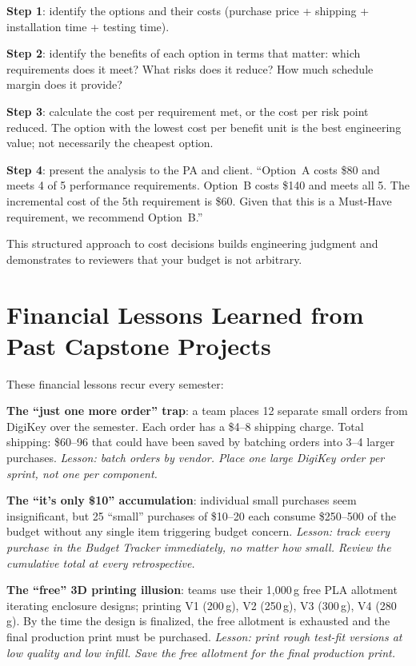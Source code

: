 \textbf{Step 1}: identify the options and their costs (purchase price + shipping + installation time + testing time).

\textbf{Step 2}: identify the benefits of each option in terms that matter: which requirements does it meet? What risks does it reduce? How much schedule margin does it provide?

\textbf{Step 3}: calculate the cost per requirement met, or the cost per risk point reduced. The option with the lowest cost per benefit unit is the best engineering value; not necessarily the cheapest option.

\textbf{Step 4}: present the analysis to the PA and client. ``Option~A costs \$80 and meets 4 of 5 performance requirements. Option~B costs \$140 and meets all 5. The incremental cost of the 5th requirement is \$60. Given that this is a Must-Have requirement, we recommend Option~B.''

This structured approach to cost decisions builds engineering judgment and demonstrates to reviewers that your budget is not arbitrary.



\section{Financial Lessons Learned from Past Capstone Projects}
These financial lessons recur every semester:

\textbf{The ``just one more order'' trap}: a team places 12 separate small orders from DigiKey over the semester. Each order has a \$4--8 shipping charge. Total shipping: \$60--96 that could have been saved by batching orders into 3--4 larger purchases. \emph{Lesson: batch orders by vendor. Place one large DigiKey order per sprint, not one per component.}

\textbf{The ``it's only \$10'' accumulation}: individual small purchases seem insignificant, but 25 ``small'' purchases of \$10--20 each consume \$250--500 of the budget without any single item triggering budget concern. \emph{Lesson: track every purchase in the Budget Tracker immediately, no matter how small. Review the cumulative total at every retrospective.}

\textbf{The ``free'' 3D printing illusion}: teams use their 1,000\,g free PLA allotment iterating enclosure designs; printing V1 (200\,g), V2 (250\,g), V3 (300\,g), V4 (280\,g). By the time the design is finalized, the free allotment is exhausted and the final production print must be purchased. \emph{Lesson: print rough test-fit versions at low quality and low infill. Save the free allotment for the final production print.}


